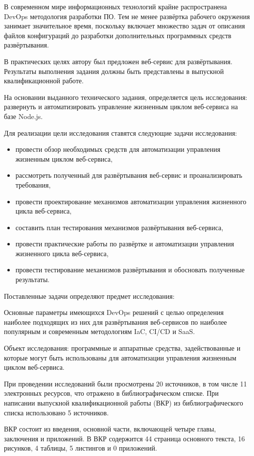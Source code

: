 \Introduction

В современном мире информационных технологий крайне распространена DevOps методология разработки ПО\cite{projectPhoenix}.
Тем не менее развёртка рабочего окружения занимает значительное время, поскольку включает множество задач от
описания файлов конфигураций до разработки дополнительных программных средств развёртывания.

В практических целях автору был предложен веб-сервис для развёртывания.
Результаты выполнения задания должны быть представлены в выпускной квалификационной работе.

На основании выданного технического задания, определяется цель исследования: развернуть и автоматизировать управление жизненным циклом веб-сервиса на базе Node.js.

Для реализации цели исследования ставятся следующие задачи исследования:

\begin{itemize}
    \item провести обзор необходимых средств для автоматизации управления жизненным циклом веб-сервиса,
    \item рассмотреть полученный для развёртывания веб-сервис и проанализировать требования,
    \item провести проектирование механизмов автоматизации управления жизненного цикла веб-сервиса,
    \item составить план тестирования механизмов развёртывания веб-сервиса,
    \item провести практические работы по развёртке и автоматизации управления жизненного цикла веб-сервиса,
    \item провести тестирование механизмов развёртывания и обосновать полученные результаты.
\end{itemize}

Поставленные задачи определяют предмет исследования:

Основные параметры имеющихся DevOps решений с целью определения наиболее подходящих из них для развёртывания веб-сервисов
по наиболее популярным и современным методологиям IaC, CI/CD и SaaS.

Объект исследования: программные и аппаратные средства, задействованные и которые могут быть использованы для автоматизации управления жизненным циклом веб-сервиса.

При проведении исследований были просмотрены 20 источников, в том числе 11 электронных ресурсов, что отражено в библиографическом списке.
При написании выпускной квалификационной работы (ВКР) из библиографического списка использовано 5 источников.

ВКР состоит из введения, основной части, включающей четыре главы, заключения и приложений.
В ВКР содержится 44 страница основного текста, 16 рисунков, 4 таблицы, 5 листингов и 0 приложений\cite{vkrsen}.
